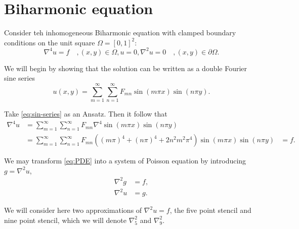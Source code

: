 \section{Biharmonic equation}
\label{sec:PDE}

Consider teh inhomogeneous Biharmonic equation with clamped boundary conditions on the unit square $\Omega = [0, 1]^2$:
\begin{subequations}\label{eq:PDE}
  \begin{equation}
    \nabla^4 u = f \quad, (x, y) \in \Omega,
  \end{equation}
  \begin{equation}
    u = 0, \nabla^2u = 0 \quad, (x, y) \in \partial\Omega.
  \end{equation}
\end{subequations}

We will begin by showing that the solution can be written as a double Fourier sine series
\begin{equation}\label{eq:sin-series}
  u(x, y) =
  \sum_{m=1}^\infty
  \sum_{n=1}^\infty
  F_{mn} \sin(m\pi x)\sin(n\pi y).
\end{equation}

Take \eqref{eq:sin-series} as an Ansatz.
Then it follow that
\begin{align}
  \nabla^4 u &=
  \sum_{m=1}^\infty
  \sum_{n=1}^\infty
  F_{mn}
  \nabla^4
  \sin(m\pi x)\sin(n\pi y)\\
  &=
  \sum_{m=1}^\infty
  \sum_{n=1}^\infty
  F_{mn}
  \left(
  (m\pi)^4 + (n\pi)^4 + 2n^2m^2\pi^4
  \right)
  \sin(m\pi x)\sin(n\pi y)
  &= f.
\end{align}


We may transform \eqref{eq:PDE} into a system of Poisson equation by introducing $g = \nabla^2 u$,
\begin{align}\label{eq:PDE-poisson}
  \nabla^2g &= f,\\
  \nabla^2u &= g.
\end{align}


We will consider here two approximations of $\nabla^2 u = f$, the five point stencil and nine point stencil, which we will denote $\nabla_5^2$ and $\nabla_9^2$.

\newcommand{\crossStencil}[5]{%
  \begin{tikzpicture}[scale=0.5,baseline=1mm, every node/.style={scale=0.7}]
    \draw node[below]{$#1$} (0,0) -- (0,2) node[above]{$#2$};
    \draw (-1, 1) node[left]{$#3$} -- (1, 1) node[right]{$#4$};
    \node[above right] at (0,1) {$#5$};
  \end{tikzpicture}
}

